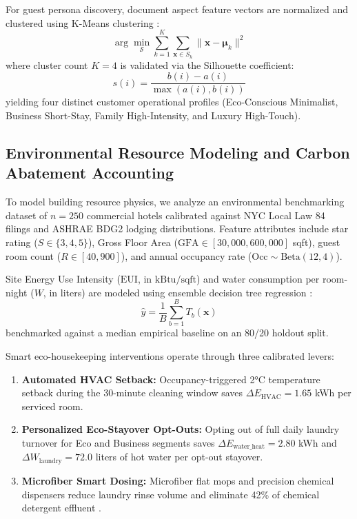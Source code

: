 \documentclass[11pt,a4paper]{article}
\begin{document}
For guest persona discovery, document aspect feature vectors are normalized and clustered using K-Means clustering \cite{rousseeuw1987}:
\begin{equation}
\arg\min_{\mathcal{S}} \sum_{k=1}^K \sum_{\mathbf{x} \in S_k} \|\mathbf{x} - \mathbf{\mu}_k\|^2
\end{equation}
where cluster count $K=4$ is validated via the Silhouette coefficient:
\begin{equation}
s(i) = \frac{b(i) - a(i)}{\max(a(i), b(i))}
\end{equation}
yielding four distinct customer operational profiles (Eco-Conscious Minimalist, Business Short-Stay, Family High-Intensity, and Luxury High-Touch).

\subsection{Environmental Resource Modeling and Carbon Abatement Accounting}
To model building resource physics, we analyze an environmental benchmarking dataset of $n=250$ commercial hotels calibrated against NYC Local Law 84 filings \cite{nycll842023} and ASHRAE BDG2 lodging distributions. Feature attributes include star rating ($S \in \{3, 4, 5\}$), Gross Floor Area ($\text{GFA} \in [30{,}000, 600{,}000]$ sqft), guest room count ($R \in [40, 900]$), and annual occupancy rate ($\text{Occ} \sim \text{Beta}(12, 4)$).

Site Energy Use Intensity ($\text{EUI}$, in $\text{kBtu}/\text{sqft}$) and water consumption per room-night ($W$, in liters) are modeled using ensemble decision tree regression \cite{breiman2001}:
\begin{equation}
\hat{y} = \frac{1}{B} \sum_{b=1}^B T_b(\mathbf{x})
\end{equation}
benchmarked against a median empirical baseline on an 80/20 holdout split.

Smart eco-housekeeping interventions operate through three calibrated levers:
\begin{enumerate}
    \item \textbf{Automated HVAC Setback:} Occupancy-triggered 2°C temperature setback during the 30-minute cleaning window saves $\Delta E_{\text{HVAC}} = 1.65$ kWh per serviced room.
    \item \textbf{Personalized Eco-Stayover Opt-Outs:} Opting out of full daily laundry turnover for Eco and Business segments saves $\Delta E_{\text{water\_heat}} = 2.80$ kWh and $\Delta W_{\text{laundry}} = 72.0$ liters of hot water per opt-out stayover.
    \item \textbf{Microfiber Smart Dosing:} Microfiber flat mops and precision chemical dispensers reduce laundry rinse volume and eliminate 42\% of chemical detergent effluent \cite{han2018}.
\end{enumerate}
\end{document}
